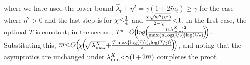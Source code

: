 \documentclass[11pt]{article}
\theoremstyle{definition}
\theoremstyle{plain}
\newcommand{\eps}{{\varepsilon}}
\renewcommand{\eps}{\varepsilon}
\begin{document}
where we have used the lower bound $\widehat{\lambda}_t + \eta^2 = \gamma(1 + 2\widetilde{m}_t) \geq \gamma$ for the case where $\eta^2 > 0$ and the last step is for $\chi \hspace{-0.25em}\leq\hspace{-0.25em} \frac{1}{4}$ and $\frac{\chi\sqrt{\hspace{-0.1em}\kappa^{X}\hspace{-0.1em}(\eta^2)}}{2-\chi}\hspace{-0.25em}<\hspace{-0.25em}1$. In the first case, the optimal $T$ is constant; in the second, 
$T^{\star}\hspace{-0.25em}=\hspace{-0.25em}O\hspace{-0.3em}\left(\hspace{-0.2em}\log\hspace{-0.2em}\left(\hspace{-0.2em}\frac{(\eps\lambda_{\min}^{X})^2}{\max\left\{d,\log(\nicefrac{1}{\varrho})\hspace{-0.1em}\right\}\hspace{-0.2em}\log(\nicefrac{1}{\delta})}\hspace{-0.2em}\right)\hspace{-0.25em}\right).$ Substituting this,
$\overline{m}\hspace{-0.25em}\leq\hspace{-0.25em}O\hspace{-0.2em}\left(\hspace{-0.2em}\chi\hspace{-0.2em}\left(\hspace{-0.25em}\sqrt{\lambda_{\max}^{X}}\hspace{-0.2em}+\hspace{-0.2em}\frac{T\max\left\{\log(\nicefrac{T}{\delta}),\log(\nicefrac{T}{\varrho})\hspace{-0.1em}\right\}}{\eps}\hspace{-0.2em}\right)\hspace{-0.25em}\right)$, and noting that the asymptotics are unchanged under $\lambda_{\min}^{X}\hspace{-0.25em}<\hspace{-0.25em}\gamma(\hspace{-0.1em}1\hspace{-0.1em}+\hspace{-0.1em}2\overline{m})$ completes the proof. \hfill \qedsymbol

\end{document}
